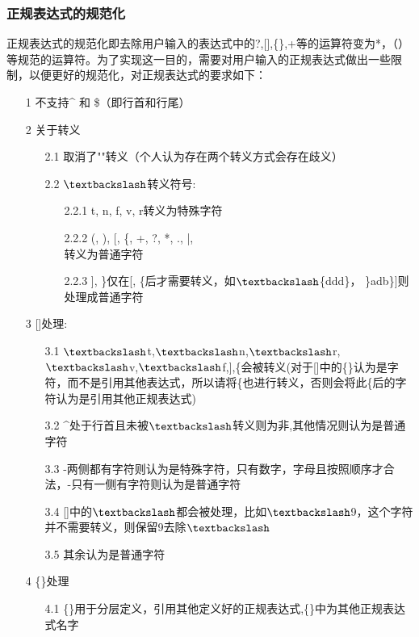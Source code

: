 \subsubsection{正规表达式的规范化}
\quad 正规表达式的规范化即去除用户输入的表达式中的?,[],\{\},+等的运算符变为*，（）等规范的运算符。为了实现这一目的，需要对用户输入的正规表达式做出一些限制，以便更好的规范化，对正规表达式的要求如下：\\
\begin{itemize}
    \item[1]不支持\^{} 和 \$（即行首和行尾）
    \item[2]关于转义
    \begin{itemize}
        \item[2.1]取消了""转义（个人认为存在两个转义方式会存在歧义）
        \item[2.2]$\textbackslash$转义符号:
        \begin{itemize}
            \item[2.2.1]t, n, f, v, r转义为特殊字符
            \item[2.2.2](, ), [, \{, +, ?, *, ., |, \\ 转义为普通字符
            \item[2.2.3]], \}仅在[, \{后才需要转义，如$\textbackslash$\{ddd\}， \}adb\}]则处理成普通字符
        \end{itemize}
    \end{itemize}
    \item[3][]处理:
    \begin{itemize}
        \item[3.1]$\textbackslash$t,$\textbackslash$n,$\textbackslash$r,$\textbackslash$v,$\textbackslash$f,],\{会被转义(对于[]中的\{\}认为是字符，而不是引用其他表达式，所以请将\{也进行转义，否则会将此\{后的字符认为是引用其他正规表达式)
        \item[3.2]\^{}处于行首且未被$\textbackslash$转义则为非,其他情况则认为是普通字符
        \item[3.3]-两侧都有字符则认为是特殊字符，只有数字，字母且按照顺序才合法，-只有一侧有字符则认为是普通字符
        \item[3.4][]中的$\textbackslash$都会被处理，比如$\textbackslash$9，这个字符并不需要转义，则保留9去除$\textbackslash$
        \item[3.5]其余认为是普通字符
    \end{itemize}
    \item[4]\{\}处理
    \begin{itemize}
        \item[4.1] \{\}用于分层定义，引用其他定义好的正规表达式,\{\}中为其他正规表达式名字

\end{itemize}
\end{itemize}
